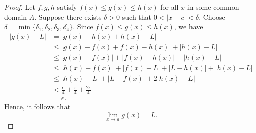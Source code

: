 \begin{proof}
Let \( f, g, h \) satisfy \( f(x) \leq g(x) \leq h(x) \) for all \( x  \) in some common domain \( A  \). 
Suppose there exists \( \delta > 0  \) such that \(  0 < | x - c  | < \delta  \). Choose \( \delta = \min \{ \delta_1, \delta_2, \delta_3, \delta_4  \}  \). Since \( f(x) \leq g(x) \leq h(x) \), we have 
\begin{align*}
    | g(x) - L  | &= | g(x) - h(x) + h(x) - L  |  \\
                  &\leq | g(x) - f(x) + f(x) - h(x)  | + | h(x) - L  | \\ 
                  &\leq | g(x) - f(x) | + | f(x) - h(x)  | + | h(x) - L  | \\
                  &\leq | h(x) - f(x)  | + | f(x) - L  | + | L - h(x) | + | h(x) - L  | \\
                  &\leq | h(x) - L| + | L - f(x) | + 2| h(x) - L  | \\
                  &< \frac{ \epsilon  }{ 4 } + \frac{ \epsilon  }{ 4 } + \frac{ 2 \epsilon  }{ 4 } \\
                  &= \epsilon.
\end{align*}
Hence, it follows that 
\[  \lim_{ x \to a } g(x) = L. \]
\end{proof}







